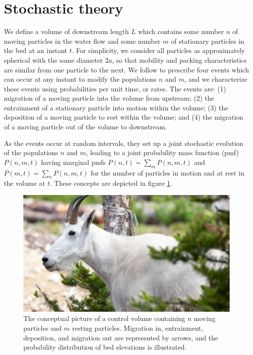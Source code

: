 \documentclass[draft]{agujournal2018}
\begin{document}
\section{Stochastic theory}

We define a volume of downstream length $L$ which contains some number $n$ of moving particles in the water flow and some number $m$ of stationary particles in the bed at an instant $t$.
For simplicity, we consider all particles as approximately spherical with the same diameter $2a$, so that mobility and packing characteristics are similar from one particle to the next.
We follow \citet{Ancey2008} to prescribe four events which can occur at any instant to modify the populations $n$ and $m$, and we characterize these events using probabilities per unit time, or rates.
The events are: (1) migration of a moving particle into the volume from upstream; (2) the entrainment of a stationary particle into motion within the volume; (3) the deposition of a moving particle to rest within the volume; and (4) the migration of a moving particle out of the volume to downstream.

As the events occur at random intervals, they set up a joint stochastic evolution of the populations $n$ and $m$, leading to a joint probability mass function (pmf) $P(n,m,t)$ having marginal pmfs $P(n,t) = \sum_m P(n,m,t)$ and $P(m,t) = \sum_n P(n,m,t)$ for the number of particles in motion and at rest in the volume at $t$.
These concepts are depicted in figure \ref{fig:concept}.
\begin{figure}
  \includegraphics[width=\linewidth,keepaspectratio]{rectdummy}
  \caption{The conceptual picture of a control volume containing $n$ moving particles and $m$ resting particles. Migration in, entrainment, deposition, and migration out are represented by arrows, and the probability distribution of bed elevations is illustrated.}
  \label{fig:concept}
\vspace{-1.0cm}
\end{figure}
\end{document}
